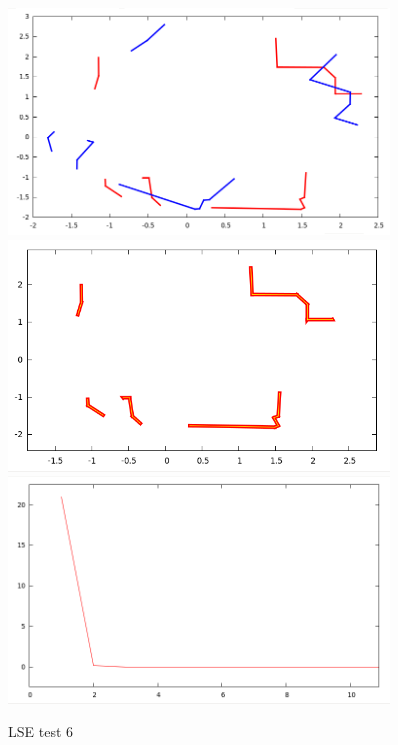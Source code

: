 \documentclass[a4paper, onecolumn]{report}
\begin{document}
\begin{figure}[htbp]
\centering
\includegraphics[width=0.9\textwidth]{images/foto_test/0.5_-0.3_0.5236/before_after.png}
\includegraphics[width=0.9\textwidth]{images/foto_test/0.5_-0.3_0.5236/result.png}
\includegraphics[width=0.9\textwidth]{images/foto_test/0.5_-0.3_0.5236/chi_new.png}
\caption{LSE test 6}
\end{figure}
\end{document}
